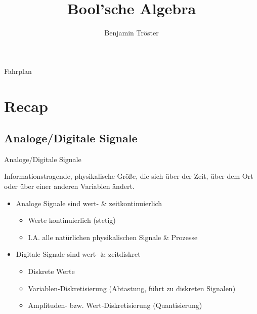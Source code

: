 \documentclass[12pt%
,aspectratio=169%
]{beamer}
\author{Benjamin Tröster}
\title[Bool'sche Algebra]{Bool'sche Algebra}
\institute[HTW Berlin]{Hochschule für Technik und Wirtschaft Berlin}
\begin{document}
\begin{frame}
\titlepage
\end{frame}

\begin{frame}{Fahrplan}
\tableofcontents[hideothersubsections]
\end{frame}

\section{Recap}
\subsection{Analoge/Digitale Signale}
\begin{frame}{Analoge/Digitale Signale}
\begin{definition}[Signal]
  		Informationstragende, physikalische Größe, die sich über der Zeit, über dem Ort oder über einer anderen Variablen ändert.
\end{definition}
\begin{itemize}
	\item Analoge Signale sind wert- \& zeitkontinuierlich
	\begin{itemize}
		\item Werte kontinuierlich (stetig)
		\item I.A. alle natürlichen physikalischen Signale \& Prozesse
	\end{itemize}
	\item Digitale Signale sind wert- \& zeitdiskret
	\begin{itemize}
		\item Diskrete Werte
		\item Variablen-Diskretisierung (Abtastung, führt zu diskreten Signalen)
		\item Amplituden- bzw. Wert-Diskretisierung (Quantisierung)
	\end{itemize}	
\end{itemize}
\end{frame}
\end{document}
